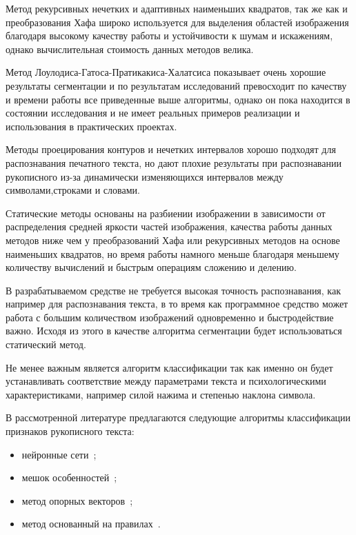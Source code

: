 Метод рекурсивных нечетких и адаптивных наименьших квадратов, так же как и преобразования Хафа широко используется для выделения областей изображения благодаря высокому качеству работы и устойчивости к шумам и искажениям, однако вычислительная стоимость данных методов велика.

Метод Лоулодиса-Гатоса-Пратикакиса-Халатсиса показывает очень хорошие результаты сегментации и по результатам исследований превосходит по качеству и времени работы все приведенные выше алгоритмы, однако он пока находится в состоянии исследования и не имеет реальных примеров реализации и использования в практических проектах.

Методы проецирования контуров и нечетких интервалов хорошо подходят для распознавания печатного текста, но дают плохие результаты при распознавании рукописного из-за динамически изменяющихся интервалов между символами,строками и словами.

Статические методы основаны на разбиении изображении в зависимости от распределения средней яркости частей изображения, качества работы данных методов ниже чем у преобразований Хафа или рекурсивных методов на основе наименьших квадратов, но время работы намного меньше благодаря меньшему количеству вычислений и быстрым операциям сложению и делению.

В разрабатываемом средстве не требуется высокая точность распознавания, как например для распознавания текста, в то время как программное средство может работа с большим количеством изображений одновременно и быстродействие важно. Исходя из этого в качестве алгоритма сегментации будет использоваться статический метод.

Не менее важным является алгоритм классификации так как именно он будет устанавливать соответствие между параметрами текста и психологическими характеристиками, например силой нажима и степенью наклона символа.

В рассмотренной литературе предлагаются следующие алгоритмы классификации признаков рукописного текста:
\begin{itemize}
  \item нейронные сети~\cite{champa_ananda_kumar_ann, grewal_prashar, gabrani_solomon_dviwe,puri_lakhwani, dang_kumar, kathait_singh};
  \item мешок особенностей~\cite{rothacker_bag_of_features};
  \item метод опорных векторов~\cite{slideshare_khandelwal_garg, gabrani_solomon_dviwe, prasad_singh_sapre};
  \item метод основанный на правилах~\cite{champa_ananda_kumar_rule_base}.
\end{itemize}

